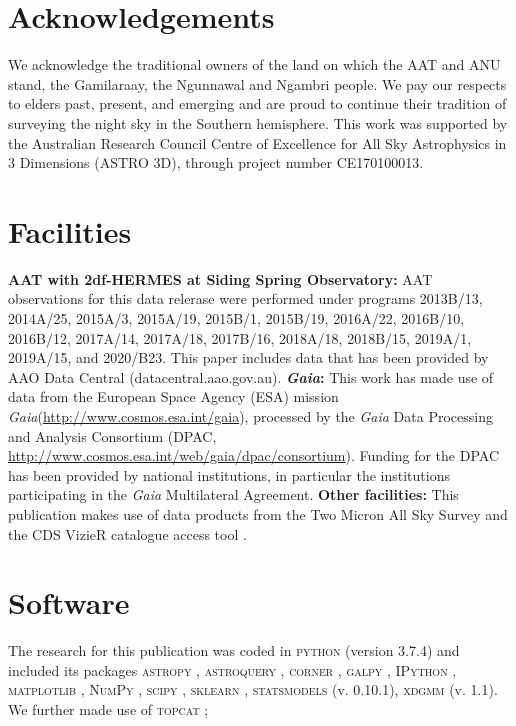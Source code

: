 \documentclass[
  journal=pasa,
  manuscript=research-paper, %
  year=2021,
  volume=37
]{cup-journal}
\newcommand{\Gaia}{\textit{Gaia}\xspace}
\begin{document}
\section*{Acknowledgements}

We acknowledge the traditional owners of the land on which the AAT and ANU stand, the Gamilaraay, the Ngunnawal and Ngambri people. We pay our respects to elders past, present, and emerging and are proud to continue their tradition of surveying the night sky in the Southern hemisphere.
This work was supported by the Australian Research Council Centre of Excellence for All Sky Astrophysics in 3 Dimensions (ASTRO 3D), through project number CE170100013.

\section*{Facilities}

\textbf{AAT with 2df-HERMES at Siding Spring Observatory:}
AAT observations for this data relerase were performed under programs {2013B/13}, {2014A/25}, {2015A/3}, {2015A/19}, {2015B/1}, {2015B/19}, {2016A/22}, {2016B/10}, {2016B/12}, {2017A/14}, {2017A/18}, {2017B/16}, {2018A/18}, {2018B/15}, {2019A/1}, {2019A/15}, and {2020/B23}. This paper includes data that has been provided by AAO Data Central (datacentral.aao.gov.au).
\textbf{\Gaia: } This work has made use of data from the European Space Agency (ESA) mission \Gaia (\url{http://www.cosmos.esa.int/gaia}), processed by the \Gaia Data Processing and Analysis Consortium (DPAC, \url{http://www.cosmos.esa.int/web/gaia/dpac/consortium}). Funding for the DPAC has been provided by national institutions, in particular the institutions participating in the \Gaia Multilateral Agreement. 
\textbf{Other facilities:} This publication makes use of data products from the Two Micron All Sky Survey \citep{Skrutskie2006} and the CDS VizieR catalogue access tool \citep{Vizier2000}.

\section*{Software}

The research for this publication was coded in \textsc{python} (version 3.7.4) and included its packages
\textsc{astropy} \citep[v. 3.2.2;][]{Robitaille2013,PriceWhelan2018},
\textsc{astroquery} \citep[v. 0.4;][]{Ginsburg2019},
\textsc{corner} \citep[v. 2.0.1;][]{corner},
\textsc{galpy} \citep[version 1.6.0;][]{Bovy2015},
\textsc{IPython} \citep[v. 7.8.0;][]{ipython},
\textsc{matplotlib} \citep[v. 3.1.3;][]{matplotlib},
\textsc{NumPy} \citep[v. 1.17.2;][]{numpy},
\textsc{scipy} \citep[version 1.3.1;][]{scipy},
\textsc{sklearn} \citep[v. 0.21.3;][]{scikit-learn},
\textsc{statsmodels} (v. 0.10.1),
\textsc{xdgmm} (v. 1.1).
We further made use of \textsc{topcat} \citep[version 4.7;][]{Taylor2005};
\end{document}
